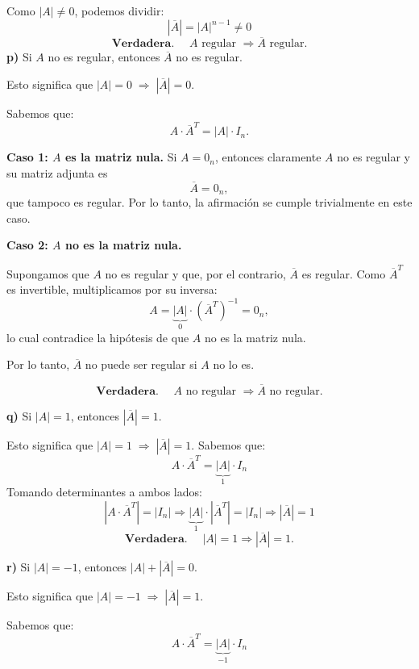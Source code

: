 \documentclass[a4paper,12pt]{article}
\begin{document}
\begin{ejercicio}[title=Ejercicio 42 (⋆)]
Como $|A| \neq 0$, podemos dividir:
\[
|\overline{A}| = |A|^{n-1} \neq 0
\]
\[
\boxed{\textbf{Verdadera. }\quad A \text{ regular } \Rightarrow \overline{A} \text{ regular.}}
\]
\textbf{p)} Si $A$ no es regular, entonces $\overline{A}$ no es regular.

\vspace{0.5em}

Esto significa que $|A| = 0 \;\Rightarrow\; |\overline{A}| = 0$.  

Sabemos que:
\[
A \cdot \overline{A}^T = |A| \cdot I_n.
\]

\textbf{Caso 1: $A$ es la matriz nula.}  
Si $A = 0_n$, entonces claramente $A$ no es regular y su matriz adjunta es
\[
\overline{A} = 0_n,
\]
que tampoco es regular. Por lo tanto, la afirmación se cumple trivialmente en este caso.

\vspace{0.5em}

\textbf{Caso 2: $A$ no es la matriz nula.} 

Supongamos que $A$ no es regular y que, por el contrario, $\overline{A}$ es regular.  
Como $\overline{A}^T$ es invertible, multiplicamos por su inversa:
\[
A = \underbrace{|A|}_{0} \cdot (\overline{A}^T)^{-1} = 0_n,
\]
lo cual contradice la hipótesis de que $A$ no es la matriz nula.  

Por lo tanto, $\overline{A}$ no puede ser regular si $A$ no lo es.

\[
\boxed{\textbf{Verdadera. }\quad A \text{ no regular } \Rightarrow \overline{A} \text{ no regular.}}
\]

\textbf{q)} Si $|A| = 1$, entonces $|\overline{A}| = 1$.

\vspace{0.5em}

Esto significa que $|A| = 1 \;\Rightarrow\; |\overline{A}| = 1$.  
Sabemos que:
\[
A \cdot \overline{A}^T = \underbrace{|A|}_{1} \cdot I_n
\]
Tomando determinantes a ambos lados:
\[
|A \cdot \overline{A}^T| = |I_n|
\Rightarrow
\underbrace{|A|}_{1} \cdot |\overline{A}^T| = |I_n|
\Rightarrow
|\overline{A}| = 1
\]
\[
\boxed{\textbf{Verdadera. }\quad |A| = 1 \Rightarrow |\overline{A}| = 1.}
\]

\vspace{1em}

\textbf{r)} Si $|A| = -1$, entonces $|A| + |\overline{A}| = 0$.

\vspace{0.5em}

Esto significa que $|A| = -1 \;\Rightarrow\; |\overline{A}| = 1.$

Sabemos que:
\[
A \cdot \overline{A}^T = \underbrace{|A|}_{-1} \cdot I_n
\]
\end{ejercicio}
\end{document}

